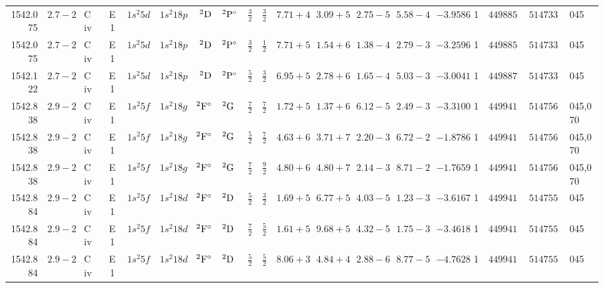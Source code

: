 \begin{table*}
\begin{tabular}{rrlcr@{ -- }lr@{ -- }lr@{ -- }lllllrrr@{ -- }rl}
   1542.075\phantom{0000000} & $2.7-2$ & C\,{\sc iv} & E1 &  $1s^{2}5d$ & $1s^{2}18p$ &       $^{2}{\rm D}$ & $^{2}{\rm P}^\circ$ &  $\frac{3}{2}$ & $\frac{3}{2}$  & $7.71+4$ & $3.09+5$ & $2.75-5$ & $5.58-4$ & $ -3.9586$ &     1 & $449885.50$ & $514733.20$ & 045 \\
   1542.075\phantom{0000000} & $2.7-2$ & C\,{\sc iv} & E1 &  $1s^{2}5d$ & $1s^{2}18p$ &       $^{2}{\rm D}$ & $^{2}{\rm P}^\circ$ &  $\frac{3}{2}$ & $\frac{1}{2}$  & $7.71+5$ & $1.54+6$ & $1.38-4$ & $2.79-3$ & $ -3.2596$ &     1 & $449885.50$ & $514733.20$ & 045 \\
   1542.122\phantom{0000000} & $2.7-2$ & C\,{\sc iv} & E1 &  $1s^{2}5d$ & $1s^{2}18p$ &       $^{2}{\rm D}$ & $^{2}{\rm P}^\circ$ &  $\frac{5}{2}$ & $\frac{3}{2}$  & $6.95+5$ & $2.78+6$ & $1.65-4$ & $5.03-3$ & $ -3.0041$ &     1 & $449887.50$ & $514733.20$ & 045 \\
   1542.838\phantom{0000000} & $2.9-2$ & C\,{\sc iv} & E1 &  $1s^{2}5f$ & $1s^{2}18g$ & $^{2}{\rm F}^\circ$ & $^{2}{\rm G}$       &  $\frac{7}{2}$ & $\frac{7}{2}$  & $1.72+5$ & $1.37+6$ & $6.12-5$ & $2.49-3$ & $ -3.3100$ &     1 & $449941.30$ & $514756.90$ & 045,070 \\
   1542.838\phantom{0000000} & $2.9-2$ & C\,{\sc iv} & E1 &  $1s^{2}5f$ & $1s^{2}18g$ & $^{2}{\rm F}^\circ$ & $^{2}{\rm G}$       &  $\frac{5}{2}$ & $\frac{7}{2}$  & $4.63+6$ & $3.71+7$ & $2.20-3$ & $6.72-2$ & $ -1.8786$ &     1 & $449941.30$ & $514756.90$ & 045,070 \\
   1542.838\phantom{0000000} & $2.9-2$ & C\,{\sc iv} & E1 &  $1s^{2}5f$ & $1s^{2}18g$ & $^{2}{\rm F}^\circ$ & $^{2}{\rm G}$       &  $\frac{7}{2}$ & $\frac{9}{2}$  & $4.80+6$ & $4.80+7$ & $2.14-3$ & $8.71-2$ & $ -1.7659$ &     1 & $449941.30$ & $514756.90$ & 045,070 \\
   1542.884\phantom{0000000} & $2.9-2$ & C\,{\sc iv} & E1 &  $1s^{2}5f$ & $1s^{2}18d$ & $^{2}{\rm F}^\circ$ & $^{2}{\rm D}$       &  $\frac{5}{2}$ & $\frac{3}{2}$  & $1.69+5$ & $6.77+5$ & $4.03-5$ & $1.23-3$ & $ -3.6167$ &     1 & $449941.30$ & $514755.00$ & 045 \\
   1542.884\phantom{0000000} & $2.9-2$ & C\,{\sc iv} & E1 &  $1s^{2}5f$ & $1s^{2}18d$ & $^{2}{\rm F}^\circ$ & $^{2}{\rm D}$       &  $\frac{7}{2}$ & $\frac{5}{2}$  & $1.61+5$ & $9.68+5$ & $4.32-5$ & $1.75-3$ & $ -3.4618$ &     1 & $449941.30$ & $514755.00$ & 045 \\
   1542.884\phantom{0000000} & $2.9-2$ & C\,{\sc iv} & E1 &  $1s^{2}5f$ & $1s^{2}18d$ & $^{2}{\rm F}^\circ$ & $^{2}{\rm D}$       &  $\frac{5}{2}$ & $\frac{5}{2}$  & $8.06+3$ & $4.84+4$ & $2.88-6$ & $8.77-5$ & $ -4.7628$ &     1 & $449941.30$ & $514755.00$ & 045 \\

\end{tabular}
\end{table*}

